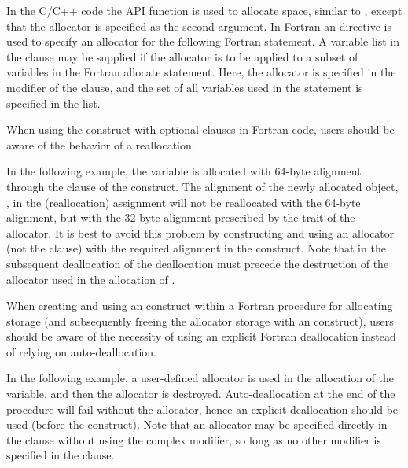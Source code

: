 In the C/C++ code the API   function is used
to allocate space, similar to , except that the allocator
is specified as the second argument.
In Fortran an  directive is used to specify an allocator
for the following Fortran  statement.
A variable list in the  clause may be supplied if the allocator
is to be applied to a subset of variables in the Fortran allocate
statement.
Here, the  allocator is specified
in the modifier of the  clause,
and the set of all variables used in the  statement is specified in the list.




When using the  construct with optional clauses in Fortran code, 
users should be aware of the behavior of a reallocation.

In the following example, the  variable is allocated with 64-byte
alignment through the  clause of the  construct.
The alignment of the newly allocated object, , in the (reallocation)
assignment  will not be reallocated with the 64-byte alignment, but
with the 32-byte alignment prescribed by the trait of the  
allocator. It is best to avoid this problem by constructing and using an
allocator (not the  clause) with the required alignment in 
the  construct.
Note that in the subsequent
deallocation of  the deallocation must precede the destruction
of the allocator used in the allocation of .


When creating and using an  construct within a Fortran procedure
for allocating storage (and subsequently freeing the allocator storage with an 
 construct), users should be aware of the necessity
of using an explicit Fortran deallocation instead of relying on auto-deallocation.

In the following example, a user-defined allocator is used in the allocation
of the  variable, and then the allocator is destroyed.
Auto-deallocation at the end of the  procedure
will fail without the allocator, hence an explicit deallocation should be used 
(before the  construct).
Note that an allocator may be specified directly in the  clause
without using the  complex modifier, so long as no other modifier 
is specified in the clause.

